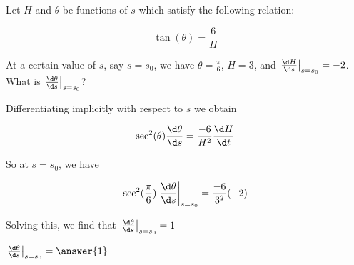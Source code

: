 \documentclass{ximera}
\author{Steven Gubkin}
\begin{document}
\begin{exercise}



Let $H$ and $\theta$ be functions of $s$ which satisfy the following relation:

\[
\tan(\theta) = \frac{6}{H}
\]

At a certain value of $s$, say $s = s_0$, we have $\theta = \frac{\pi}{6}$, $H=3$, and $\left. \frac{\d H}{\d s}\right|_{s = s_0} = -2$.  What is $\left. \frac{\d \theta}{\d s} \right|_{s = s_0}$?
\end{exercise}

\begin{hint}
	Differentiating implicitly with respect to $s$ we obtain

\[
	\sec^2(\theta) \frac{\d \theta}{\d s} = \frac{-6}{H^2} \frac{\d H}{\d t}
\]
\end{hint}

\begin{hint}
	So at $s  = s_0$, we have

\[
\sec^2(\frac{\pi}{6})\left. \frac{\d \theta}{\d s} \right|_{s = s_0} = \frac{-6}{3^2} (-2)
\]
\end{hint}

\begin{hint}
	Solving this, we find that $\left. \frac{\d \theta}{\d s} \right|_{s = s_0} = 1$
\end{hint}

\begin{prompt}
	$\left. \frac{\d \theta}{\d s} \right|_{s = s_0} = \answer{1}$
\end{prompt}
\end{document}
